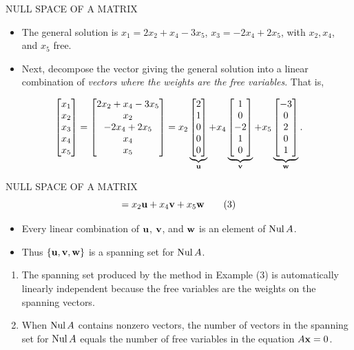 \begin{frame}[shrink=18]{NULL SPACE OF A MATRIX}
\begin{itemize}
\item The general solution is $x_1=2x_2+x_4-3x_5$, $x_3=-2x_4+2x_5$, with $x_2,x_4$, and $x_5$ free.
\item Next, decompose the vector giving the general solution into a linear combination of \emph{vectors where the weights are the free variables}. That is,
\end{itemize}
\[
\begin{bmatrix}x_1\\x_2\\x_3\\x_4\\x_5\end{bmatrix}
=\begin{bmatrix}2x_2+x_4-3x_5\\x_2\\-2x_4+2x_5\\x_4\\x_5\end{bmatrix}
=x_2\underbrace{\begin{bmatrix}2\\1\\0\\0\\0\end{bmatrix}}_{\mathbf{u}}
+x_4\underbrace{\begin{bmatrix}1\\0\\-2\\1\\0\end{bmatrix}}_{\mathbf{v}}
+x_5\underbrace{\begin{bmatrix}-3\\0\\2\\0\\1\end{bmatrix}}_{\mathbf{w}}.
\]
\end{frame}

\begin{frame}[shrink=15]{NULL SPACE OF A MATRIX}
\[
=x_2\mathbf{u}+x_4\mathbf{v}+x_5\mathbf{w} \tag{3}
\]
\begin{itemize}
\item Every linear combination of $\mathbf{u}$, $\mathbf{v}$, and $\mathbf{w}$ is an element of $\operatorname{Nul} A$.
\item Thus $\{\mathbf{u},\mathbf{v},\mathbf{w}\}$ is a spanning set for $\operatorname{Nul} A$.
\end{itemize}
\begin{enumerate}
\item The spanning set produced by the method in Example (3) is automatically linearly independent because the free variables are the weights on the spanning vectors.
\item When $\operatorname{Nul} A$ contains nonzero vectors, the number of vectors in the spanning set for $\operatorname{Nul} A$ equals the number of free variables in the equation $A\mathbf{x}=0$.
\end{enumerate}
\end{frame}

